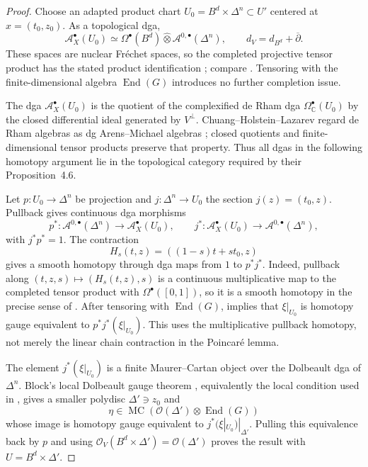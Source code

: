 \documentclass[12pt]{amsart}
\theoremstyle{definition}
\theoremstyle{remark}
\numberwithin{equation}{section}
\newcommand{\CA}{\mathcal A}
\newcommand{\CO}{\mathcal O}
\newcommand{\C}{\mathbb C}
\newcommand{\delb}{\overline{\partial}}
\newcommand{\MC}{\operatorname{MC}}
\newcommand{\End}{\operatorname{End}}
\begin{document}
\begin{proof}
Choose an adapted product chart
\(U_0=B^d\times\Delta^n\subset U'\) centered at \(x=(t_0,z_0)\).  As a
topological dga,
\[
\CA_X^\bullet(U_0)
\simeq
\Omega^\bullet(B^d)\widehat\otimes
\CA^{0,\bullet}(\Delta^n),
\qquad
d_V=d_{B^d}+\delb.
\]
These spaces are nuclear Fr\'echet spaces, so the completed projective tensor
product has the stated product identification
\cite[Theorem~51.6]{Treves1967}; compare
\cite[Theorem~A.6]{CHL2021}.  Tensoring with the finite-dimensional algebra
\(\End(G)\) introduces no further completion issue.

The dga \(\CA_X^\bullet(U_0)\) is the quotient of the complexified de Rham
dga \(\Omega^\bullet_{\C}(U_0)\) by the closed differential ideal generated
by \(V^\perp\).  Chuang--Holstein--Lazarev regard de Rham algebras as dg
Arens--Michael algebras \cite[Section~4 and Section~8.1]{CHL2021}; closed
quotients and finite-dimensional tensor products preserve that property.
Thus all dgas in the following homotopy argument lie in the topological
category required by their Proposition~4.6.

Let \(p:U_0\to\Delta^n\) be projection and
\(j:\Delta^n\to U_0\) the section \(j(z)=(t_0,z)\).  Pullback gives continuous
dga morphisms
\[
p^*:\CA^{0,\bullet}(\Delta^n)\longrightarrow
\CA_X^\bullet(U_0),
\qquad
j^*:\CA_X^\bullet(U_0)\longrightarrow
\CA^{0,\bullet}(\Delta^n),
\]
with \(j^*p^*=1\).  The contraction
\[
H_s(t,z)=((1-s)t+s t_0,z)
\]
gives a smooth homotopy through dga maps from \(1\) to \(p^*j^*\).
Indeed, pullback along
\((t,z,s)\mapsto(H_s(t,z),s)\) is a continuous multiplicative map to the
completed tensor product with \(\Omega^\bullet([0,1])\), so it is a smooth
homotopy in the precise sense of \cite[Section~4]{CHL2021}.
After tensoring with \(\End(G)\), \cite[Proposition~4.6]{CHL2021} implies
that \(\xi|_{U_0}\) is homotopy gauge equivalent to
\(p^*j^*(\xi|_{U_0})\).  This uses the multiplicative pullback homotopy,
not merely the linear chain contraction in the Poincar\'e lemma.

The element \(j^*(\xi|_{U_0})\) is a finite Maurer--Cartan object over the
Dolbeault dga of \(\Delta^n\).  Block's local Dolbeault gauge theorem
\cite[Lemma~4.5]{Block2010}, equivalently the local condition used in
\cite[Theorem~8.3]{CHL2021}, gives a smaller polydisc
\(\Delta'\ni z_0\) and
\[
\eta\in
\MC\!\left(\CO(\Delta')\otimes\End(G)\right)
\]
whose image is homotopy gauge equivalent to
\(j^*(\xi|_{U_0})|_{\Delta'}\).  Pulling this equivalence back by \(p\) and
using
\(\CO_V(B^d\times\Delta')=\CO(\Delta')\) proves the result with
\(U=B^d\times\Delta'\).
\end{proof}
\end{document}
